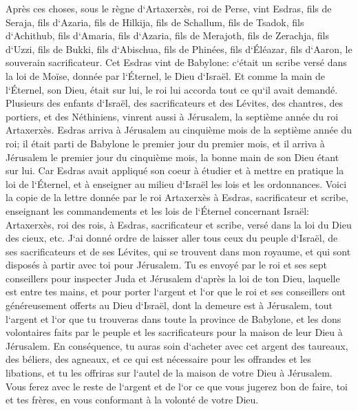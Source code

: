 \verse Après ces choses, sous le règne d`Artaxerxès, roi de Perse, vint Esdras, fils de Seraja, fils d`Azaria, fils de Hilkija, 
\verse fils de Schallum, fils de Tsadok, fils d`Achithub, 
\verse fils d`Amaria, fils d`Azaria, fils de Merajoth, 
\verse fils de Zerachja, fils d`Uzzi, fils de Bukki, 
\verse fils d`Abischua, fils de Phinées, fils d`Éléazar, fils d`Aaron, le souverain sacrificateur. 
\verse Cet Esdras vint de Babylone: c`était un scribe versé dans la loi de Moïse, donnée par l`Éternel, le Dieu d`Israël. Et comme la main de l`Éternel, son Dieu, était sur lui, le roi lui accorda tout ce qu`il avait demandé. 
\verse Plusieurs des enfants d`Israël, des sacrificateurs et des Lévites, des chantres, des portiers, et des Néthiniens, vinrent aussi à Jérusalem, la septième année du roi Artaxerxès. 
\verse Esdras arriva à Jérusalem au cinquième mois de la septième année du roi; 
\verse il était parti de Babylone le premier jour du premier mois, et il arriva à Jérusalem le premier jour du cinquième mois, la bonne main de son Dieu étant sur lui. 
\verse Car Esdras avait appliqué son coeur à étudier et à mettre en pratique la loi de l`Éternel, et à enseigner au milieu d`Israël les lois et les ordonnances. 
\verse Voici la copie de la lettre donnée par le roi Artaxerxès à Esdras, sacrificateur et scribe, enseignant les commandements et les lois de l`Éternel concernant Israël: 
\verse Artaxerxès, roi des rois, à Esdras, sacrificateur et scribe, versé dans la loi du Dieu des cieux, etc. 
\verse J`ai donné ordre de laisser aller tous ceux du peuple d`Israël, de ses sacrificateurs et de ses Lévites, qui se trouvent dans mon royaume, et qui sont disposés à partir avec toi pour Jérusalem. 
\verse Tu es envoyé par le roi et ses sept conseillers pour inspecter Juda et Jérusalem d`après la loi de ton Dieu, laquelle est entre tes mains, 
\verse et pour porter l`argent et l`or que le roi et ses conseillers ont généreusement offerts au Dieu d`Israël, dont la demeure est à Jérusalem, 
\verse tout l`argent et l`or que tu trouveras dans toute la province de Babylone, et les dons volontaires faits par le peuple et les sacrificateurs pour la maison de leur Dieu à Jérusalem. 
\verse En conséquence, tu auras soin d`acheter avec cet argent des taureaux, des béliers, des agneaux, et ce qui est nécessaire pour les offrandes et les libations, et tu les offriras sur l`autel de la maison de votre Dieu à Jérusalem. 
\verse Vous ferez avec le reste de l`argent et de l`or ce que vous jugerez bon de faire, toi et tes frères, en vous conformant à la volonté de votre Dieu. 

